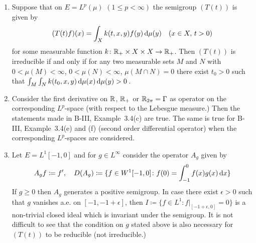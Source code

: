 \begin{examples}\label{ex:c3-3.4}
	\begin{enumerate}[\upshape (i), wide, labelindent=.5em]
	\item 
	Suppose that on $E = L^{p}(\mu)$ $(1 \leq p < \infty)$ the semigroup $(T(t))$ is given by
	\begin{equation}\label{eq:c3-3.1}
		(T(t)f)(x) = \int_{X} k(t,x,y)f(y) \mathop{}\!\mathrm{d}{\mu}(y) \quad (x \in X,\, t > 0)
	\end{equation}
	for some measurable function $k \colon \mathbb{R} _{+} \times X \times X \to \mathbb{R} _{+}$.
	Then $(T(t))$ is irreducible if and only if for any two measurable sets $M$ and $N$ with $0 < \mu(M) < \infty$, $0 < \mu(N) < \infty$, $\mu(M\cap N) = 0$ there exist $t_{0} > 0$ such that $\int_{M}\int_{N} k(t_{0},x,y)\mathop{}\!\mathrm{d}{\mu}(x)\mathop{}\!\mathrm{d}{\mu}(y) > 0$\,.
	
	\item 
	Consider the first derivative on $\mathbb{R} $, $\mathbb{R} _{+}$ or $\mathbb{R} _{2\pi} = \Gamma$ as operator on the corresponding $L^{p}$-space (with respect to the Lebesgue measure.)
	Then the statements made in B-III, Example~3.4(c) are true.
	The same is true for B-III, Example~3.4(e) and (f) (second order differential operator) when the corresponding $L^{p}$-spaces are considered.
	
	\item 
	Let $E = L^{1}[-1,0]$ and for $g \in L^{\infty}$ consider the operator $A_{g}$ given by
	\begin{equation}\label{eq:c3-3.2}
		A_{g}f \coloneqq f', \quad D(A_{g}) \coloneqq \{f \in W^{1}[-1,0] \colon f(0) = \int_{-1}^{0} f(x)g(x)\mathop{}\!\mathrm{d}{x}\}
	\end{equation}
	If $g \geq 0$ then $A_{g}$ generates a positive semigroup.
	In case there exist $\epsilon > 0$ such that $g$ vanishes a.e. on $[-1,-1+\epsilon]$, then $I \coloneqq \{f \in L^{1} \colon f|_{[-1+\epsilon,0]} = 0\}$ is a non-trivial closed ideal which is invariant under the semigroup.
	It is not difficult to see that the condition on $g$ stated above is also necessary for $(T(t))$ to be reducible (\ie  not irreducible.)


\end{enumerate}
\end{examples}

